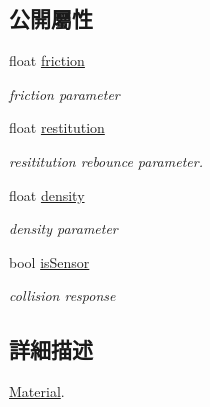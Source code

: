 \subsection*{公開屬性}
\begin{DoxyCompactItemize}
\item 
float \hyperlink{class_i_dream_sky_1_1_physics3_1_1_material_a5e11553a8c909e6cc165a26d665b8a8f}{friction}\hypertarget{class_i_dream_sky_1_1_physics3_1_1_material_a5e11553a8c909e6cc165a26d665b8a8f}{}\label{class_i_dream_sky_1_1_physics3_1_1_material_a5e11553a8c909e6cc165a26d665b8a8f}

\begin{DoxyCompactList}\small\item\em friction parameter \end{DoxyCompactList}\item 
float \hyperlink{class_i_dream_sky_1_1_physics3_1_1_material_aa8a69e75dfd5b3a86edef710d933f5e3}{restitution}
\begin{DoxyCompactList}\small\item\em resititution rebounce parameter. \end{DoxyCompactList}\item 
float \hyperlink{class_i_dream_sky_1_1_physics3_1_1_material_a0ffdaaa1df209a312751788107527433}{density}\hypertarget{class_i_dream_sky_1_1_physics3_1_1_material_a0ffdaaa1df209a312751788107527433}{}\label{class_i_dream_sky_1_1_physics3_1_1_material_a0ffdaaa1df209a312751788107527433}

\begin{DoxyCompactList}\small\item\em density parameter \end{DoxyCompactList}\item 
bool \hyperlink{class_i_dream_sky_1_1_physics3_1_1_material_acc3536df20a262a14f5c97d2034cee63}{is\+Sensor}\hypertarget{class_i_dream_sky_1_1_physics3_1_1_material_acc3536df20a262a14f5c97d2034cee63}{}\label{class_i_dream_sky_1_1_physics3_1_1_material_acc3536df20a262a14f5c97d2034cee63}

\begin{DoxyCompactList}\small\item\em collision response \end{DoxyCompactList}\end{DoxyCompactItemize}


\subsection{詳細描述}
\hyperlink{class_i_dream_sky_1_1_physics3_1_1_material}{Material}. 

